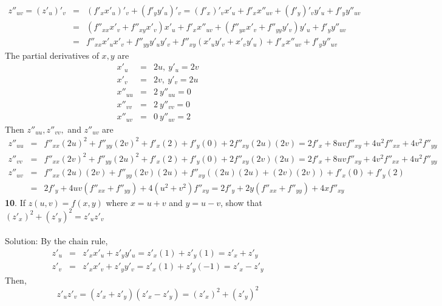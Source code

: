 \documentclass[12pt]{amsbook}
\begin{document}
\begin{eqnarray*}
z''_{uv}=(z'_{u})'_v&=&(f'_xx'_u)'_v+(f'_yy'_u)'_v=(f'_x)'_vx'_u+f'_xx''_{uv}+(f'_y)'_vy'_u+f'_yy''_{uv} \\
&=&(f''_{xx}x'_v+f''_{xy}x'_v)x'_u+f'_xx''_{uv}+ (f''_{yx}x'_v+f''_{yy}y'_v)y'_u+f'_yy''_{uv} \\
&=&f''_{xx}x'_ux'_v+f''_{yy}y'_uy'_v+f''_{xy}(x'_uy'_v+x'_vy'_u)+f'_xx''_{uv}+f'_yy''_{uv} 
\end{eqnarray*}
The partial derivatives of $x,y$ are
\begin{eqnarray*}
x'_u&=&2u, \ y'_u=2v \\
x'_v&=&2v, \ y'_v=2u \\
x''_{uu}&=& 2 \ y''_{uu}=0 \\
x''_{vv}&=& 2 \ y''_{vv}=0 \\
x''_{uv}&=& 0 \ y''_{uv}=2
\end{eqnarray*}
Then $z''_{uu}, z''_{vv}, $ and $z''_{uv}$ are
\begin{eqnarray*}
z''_{uu}&=&f''_{xx}(2u)^2+f''_{yy}(2v)^2+f'_x(2)+f'_y(0)+2f''_{xy}(2u)(2v)=2f'_x+8uvf''_{xy}+4u^2f''_{xx}+4v^2f''_{yy} \\
z''_{vv}&=&f''_{xx}(2v)^2+f''_{yy}(2u)^2+f'_x(2)+f'_y(0)+2f''_{xy}(2v)(2u)=2f'_x+8uvf''_{xy}+4v^2f''_{xx}+4u^2f''_{yy} \\
z''_{uv}&=&f''_{xx}(2u)(2v)+f''_{yy}(2v)(2u)+f''_{xy}((2u)(2u)+(2v)(2v))+f'_x(0)+f'_y(2)\\
&=&2f'_y+4uv(f''_{xx}+f''_{yy})+4(u^2+v^2)f''_{xy}=2f'_y+2y(f''_{xx}+f''_{yy})+4xf''_{xy}
\end{eqnarray*}
\noindent
{\small\bf 10}. If $z(u, v) = f(x, y)$ where $x = u + v$ and $y = u - v$, show that $(z'_x)^2+(z'_y)^2=z'_uz'_v$
\\
\\
{\sc Solution}: By the chain rule,
\begin{eqnarray*}
z'_u&=&z'_xx'_u+z'_yy'_u=z'_x(1)+z'_y(1)=z'_x+z'_y \\
z'_v&=&z'_xx'_v+z'_yy'_v=z'_x(1)+z'_y(-1)=z'_x-z'_y 
\end{eqnarray*}
Then,
$$z'_uz'_v=(z'_x+z'_y)(z'_x-z'_y)=(z'_x)^2+(z'_y)^2$$
\end{document}
